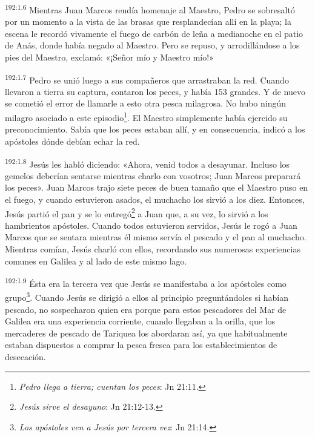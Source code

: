 \par
\textsuperscript{192:1.6} Mientras Juan Marcos rendía homenaje al Maestro, Pedro se sobresaltó por un momento a la vista de las brasas que resplandecían allí en la playa; la escena le recordó vivamente el fuego de carbón de leña a medianoche en el patio de Anás, donde había negado al Maestro. Pero se repuso, y arrodillándose a los pies del Maestro, exclamó: «¡Señor mío y Maestro mío!»

\par
\textsuperscript{192:1.7} Pedro se unió luego a sus compañeros que arrastraban la red. Cuando llevaron a tierra su captura, contaron los peces, y había 153 grandes. Y de nuevo se cometió el error de llamarle a esto otra pesca milagrosa. No hubo ningún milagro asociado a este episodio\footnote{\textit{Pedro llega a tierra; cuentan los peces}: Jn 21:11.}. El Maestro simplemente había ejercido su preconocimiento. Sabía que los peces estaban allí, y en consecuencia, indicó a los apóstoles dónde debían echar la red.

\par
\textsuperscript{192:1.8} Jesús les habló diciendo: «Ahora, venid todos a desayunar. Incluso los gemelos deberían sentarse mientras charlo con vosotros; Juan Marcos preparará los peces». Juan Marcos trajo siete peces de buen tamaño que el Maestro puso en el fuego, y cuando estuvieron asados, el muchacho los sirvió a los diez. Entonces, Jesús partió el pan y se lo entregó\footnote{\textit{Jesús sirve el desayuno}: Jn 21:12-13.} a Juan que, a su vez, lo sirvió a los hambrientos apóstoles. Cuando todos estuvieron servidos, Jesús le rogó a Juan Marcos que se sentara mientras él mismo servía el pescado y el pan al muchacho. Mientras comían, Jesús charló con ellos, recordando sus numerosas experiencias comunes en Galilea y al lado de este mismo lago.

\par
\textsuperscript{192:1.9} Ésta era la tercera vez que Jesús se manifestaba a los apóstoles como grupo\footnote{\textit{Los apóstoles ven a Jesús por tercera vez}: Jn 21:14.}. Cuando Jesús se dirigió a ellos al principio preguntándoles si habían pescado, no sospecharon quien era porque para estos pescadores del Mar de Galilea era una experiencia corriente, cuando llegaban a la orilla, que los mercaderes de pescado de Tariquea los abordaran así, ya que habitualmente estaban dispuestos a comprar la pesca fresca para los establecimientos de desecación.

